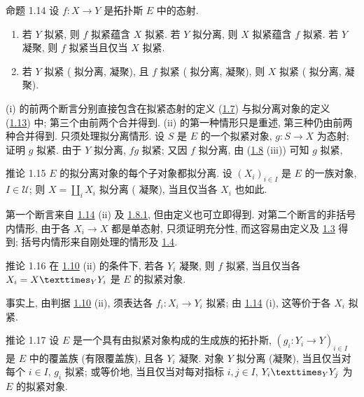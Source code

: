 \begin{enonce*}{命题 1.14}
设\pageoriginale{} $f:X\to Y$ 是拓扑斯 $E$ 中的态射.
\begin{enumerate}
\renewcommand{\theenumi}{\roman{enumi}}
\renewcommand{\labelenumi}{(\theenumi)}
\item 若 $Y$ 拟紧, 则 $f$ 拟紧蕴含 $X$ 拟紧.
若 $Y$ 拟分离, 则 $X$ 拟紧蕴含 $f$ 拟紧.
若 $Y$ 凝聚, 则 $f$ 拟紧当且仅当 $X$ 拟紧.

\item 若 $Y$ 拟紧 (\emph{\resp} 拟分离, \emph{\resp} 凝聚),
且 $f$ 拟紧 (\emph{\resp} 拟分离, \emph{\resp} 凝聚),
则 $X$ 拟紧 (\emph{\resp} 拟分离, \emph{\resp} 凝聚).
\end{enumerate}
\end{enonce*}

(i) 的前两个断言分别直接包含在拟紧态射的定义
(\hyperref[VI.def1.7]{1.7})
与拟分离对象的定义 (\hyperref[VI.def1.13]{1.13}) 中;
第三个由前两个合并得到.
(ii) 的第一种情形只是重述, 第三种仍由前两种合并得到.
只须处理拟分离情形.
设 $S$ 是 $E$ 的一个拟紧对象,
$g:S\to X$ 为态射; 证明 $g$ 拟紧.
由于 $Y$ 拟分离, $fg$ 拟紧;
又因 $f$ 拟分离, 由 (\hyperref[VI.prop1.8]{1.8} (iii)) 可知
$g$ 拟紧, \cqfd

\begin{enonce*}{推论 1.15}
$E$ 的拟分离对象的每个子对象都拟分离.
设 $(X_i)_{i\in I}$ 是 $E$ 的一族对象, $I\in 𝒰$;
则 $X=\amalg_iX_i$ 拟分离 (\emph{\resp} 凝聚),
当且仅当各 $X_i$ 也如此.
\end{enonce*}

第一个\pageoriginale{}断言来自 \hyperref[VI.prop1.14]{1.14} (ii)
及 \hyperref[VI.cor1.8.1]{1.8.1}, 但由定义也可立即得到.
对第二个断言的非括号内情形,
由于各 $X_i\to X$ 都是单态射, 只须证明充分性,
而这容易由定义及 \hyperref[VI.prop1.3]{1.3} 得到;
括号内情形来自刚处理的情形及 \hyperref[VI.cor1.4]{1.4}.

\begin{enonce*}{推论 1.16}
在 \hyperref[VI.prop1.10]{1.10} (ii) 的条件下,
若各 $Y_i$ 凝聚, 则 $f$ 拟紧,
当且仅当各 $X_i=\fprod{X}{Y_i}{Y}$ 是 $E$ 的拟紧对象.
\end{enonce*}

事实上, 由判据 \hyperref[VI.prop1.10]{1.10} (ii),
须表达各 $f_i:X_i\to Y_i$ 拟紧;
由 \hyperref[VI.prop1.14]{1.14} (i),
这等价于各 $X_i$ 拟紧.

\begin{enonce*}{推论 1.17}
设 $E$ 是一个具有由拟紧对象构成的生成族的拓扑斯,
$(g_i:Y_i\to Y)_{i\in I}$ 是 $E$ 中的覆盖族 (\resp 有限覆盖族),
且各 $Y_i$ 凝聚.
对象 $Y$ 拟分离 (\resp 凝聚),
当且仅当对每个 $i\in I$, $g_i$ 拟紧;
或等价地, 当且仅当对每对指标 $i,j\in I$,
$\fprod{Y_i}{Y_j}{Y}$ 为 $E$ 的拟紧对象.
\end{enonce*}


